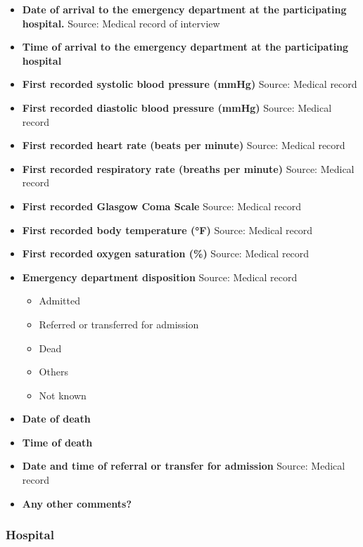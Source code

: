\documentclass[
]{scrartcl}
\providecommand{\tightlist}{%
  \setlength{\itemsep}{0pt}\setlength{\parskip}{0pt}}\usepackage{longtable,booktabs,array}
\begin{document}
\begin{itemize}
\item
  \textbf{Date of arrival to the emergency department at the
  participating hospital.} Source: Medical record of interview
\item
  \textbf{Time of arrival to the emergency department at the
  participating hospital}
\item
  \textbf{First recorded systolic blood pressure (mmHg)} Source: Medical
  record
\item
  \textbf{First recorded diastolic blood pressure (mmHg)} Source:
  Medical record
\item
  \textbf{First recorded heart rate (beats per minute)} Source: Medical
  record
\item
  \textbf{First recorded respiratory rate (breaths per minute)} Source:
  Medical record
\item
  \textbf{First recorded Glasgow Coma Scale} Source: Medical record
\item
  \textbf{First recorded body temperature (°F)} Source: Medical record
\item
  \textbf{First recorded oxygen saturation (\%)} Source: Medical record
\item
  \textbf{Emergency department disposition} Source: Medical record

  \begin{itemize}
  \tightlist
  \item
    Admitted
  \item
    Referred or transferred for admission
  \item
    Dead
  \item
    Others
  \item
    Not known
  \end{itemize}
\item
  \textbf{Date of death}
\item
  \textbf{Time of death}
\item
  \textbf{Date and time of referral or transfer for admission} Source:
  Medical record
\item
  \textbf{Any other comments?}
\end{itemize}

\subsubsection{Hospital}\label{hospital}
\end{document}

